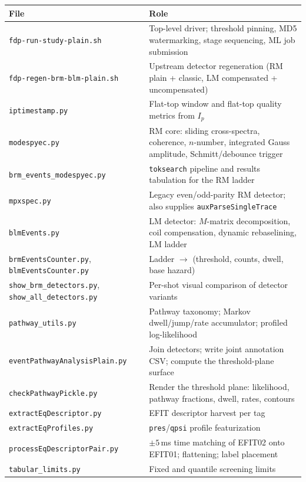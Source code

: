 \documentclass[11pt,a4paper]{article}
\newcommand{\code}[1]{\texttt{\small #1}}
\newcommand{\bk}{\discretionary{}{}{}}   %
\begin{document}
\begin{longtable}{@{}>{\raggedright\arraybackslash}p{}>{\raggedright\arraybackslash}p{}@{}}
\toprule
\textbf{File} & \textbf{Role} \\
\midrule
\endhead
\code{fdp-run-study-plain.sh} & Top-level driver; threshold pinning, MD5 watermarking, stage sequencing, ML job submission \\
\code{fdp-\bk regen-\bk brm-\bk blm-\bk plain.sh} & Upstream detector regeneration (RM plain + classic, LM compensated + uncompensated) \\
\midrule
\code{iptimestamp.py} & Flat-top window and flat-top quality metrics from $I_p$ \\
\code{modespyec.py} & RM core: sliding cross-spectra, coherence, $n$-number, integrated Gauss amplitude, Schmitt/debounce trigger \\
\code{brm\_\bk events\_\bk modespyec.py} & \code{toksearch} pipeline and results tabulation for the RM ladder \\
\code{mpxspec.py} & Legacy even/odd-parity RM detector; also supplies \code{auxParseSingleTrace} \\
\code{blmEvents.py} & LM detector: $M$-matrix decomposition, coil compensation, dynamic rebaselining, LM ladder \\
\code{brmEventsCounter.py}, \code{blmEventsCounter.py} & Ladder $\rightarrow$ (threshold, counts, dwell, base hazard) \\
\code{show\_brm\_detectors.py}, \code{show\_all\_detectors.py} & Per-shot visual comparison of detector variants \\
\midrule
\code{pathway\_utils.py} & Pathway taxonomy; Markov dwell/jump/rate accumulator; profiled log-likelihood \\
\code{eventPathway\bk Analysis\bk Plain.py} & Join detectors; write joint annotation CSV; compute the threshold-plane surface \\
\code{checkPathwayPickle.py} & Render the threshold plane: likelihood, pathway fractions, dwell, rates, contours \\
\midrule
\code{extractEqDescriptor.py} & EFIT descriptor harvest per tag \\
\code{extractEqProfiles.py} & \code{pres}/\code{qpsi} profile featurization \\
\code{processEq\bk Descriptor\bk Pair.py} & $\pm5$\,ms time matching of EFIT02 onto EFIT01; flattening; label placement \\
\code{tabular\_limits.py} & Fixed and quantile screening limits \\

\end{longtable}
\end{document}
